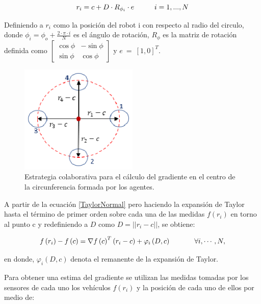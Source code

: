\begin{equation}
	r_i = c + D\cdot{R}_{\phi_i}\cdot{e}\hspace{10mm}{i = 1,...,N}
\end{equation}

Definiendo a $r_{i}$ como la posición del robot i con respecto al radio del circulo, donde ${\phi }_{i}=\phi_{o}+\frac{2\cdot\pi\cdot{i}}{N}$ es el ángulo de rotación, $R_{\phi }$ es la matriz de rotación definida como $\left[ \begin{array}{cc} {\cos\phi} & -{\sin\phi } \\  {\sin\phi } & {\cos\phi } \end{array} \right]$ y  $e\ =\ {\left[1,0\right]}^T$.

\begin{figure}[htb]
\centering
\includegraphics[width=0.5\textwidth]{figures/p3.eps}
\caption{Estrategia colaborativa para el cálculo del gradiente en el centro de la circunferencia formada por los agentes.} \label{Estrategia_Colaborativa}
\end{figure}


A partir de la ecuación \ref{TaylorNormal} pero haciendo la expansión de Taylor hasta el término de primer orden sobre cada una de las medidas $f\left(r_i\right)$ en torno al punto c y redefiniendo a $D$ como $D=||r_i-c||$, se obtiene:

\begin{equation} \label{PuntoPartidaGradiente}
	f\left(r_i\right)-f\left(c\right)=\nabla{f\left(c\right)}^T\left(r_i-c\right)+\varphi_i\left(D,c\right)\hspace{12mm}\forall{i},\cdots,N,
\end{equation}

en donde, $\varphi_i\left(D,c\right)$ denota el remanente de la expansión de Taylor. 

Para obtener una estima del gradiente se utilizan las medidas tomadas por los sensores de cada uno los vehículos $f\left(r_i\right)$ y la posición de cada uno de ellos por medio de:

